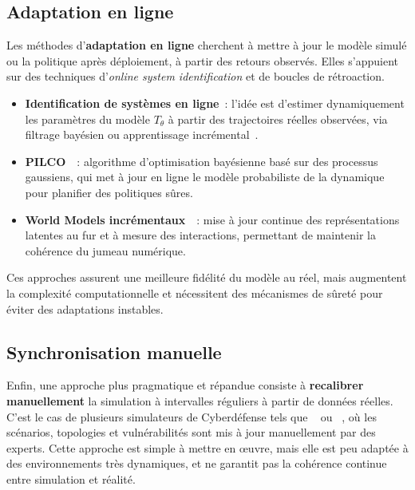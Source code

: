 \subsection{Adaptation en ligne}

\noindent
Les méthodes d'\textbf{adaptation en ligne} cherchent à
mettre à jour le modèle simulé ou la politique après déploiement,
à partir des retours observés.
Elles s'appuient sur des techniques d'\textit{online system identification}
et de boucles de rétroaction.

\begin{itemize}
  \item \textbf{Identification de systèmes en ligne}~: l'idée est d'estimer
        dynamiquement les paramètres du modèle $T_\theta$
        à partir des trajectoires réelles observées,
        via filtrage bayésien ou apprentissage incrémental~\cite{ljung1999system}.
  \item \textbf{PILCO}~\cite{deisenroth2011pilco}~: algorithme d'optimisation
        bayésienne basé sur des processus gaussiens,
        qui met à jour en ligne le modèle probabiliste de la dynamique
        pour planifier des politiques sûres.
  \item \textbf{World Models incrémentaux}~\cite{hafner2019learning}~:
        mise à jour continue des représentations latentes
        au fur et à mesure des interactions,
        permettant de maintenir la cohérence du jumeau numérique.
\end{itemize}

\noindent
Ces approches assurent une meilleure fidélité du modèle au réel,
mais augmentent la complexité computationnelle et nécessitent
des mécanismes de sûreté pour éviter des adaptations instables.

\subsection{Synchronisation manuelle}

\noindent
Enfin, une approche plus pragmatique et répandue consiste à
\textbf{recalibrer manuellement} la simulation
à intervalles réguliers à partir de données réelles.
C'est le cas de plusieurs simulateurs de Cyberdéfense tels que
~\cite{Standen2021} ou
~\cite{cyberbattlesim},
où les scénarios, topologies et vulnérabilités sont mis à jour
manuellement par des experts.
Cette approche est simple à mettre en œuvre,
mais elle est peu adaptée à des environnements très dynamiques,
et ne garantit pas la cohérence continue entre simulation et réalité.

